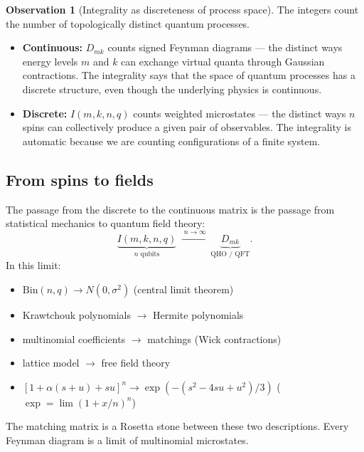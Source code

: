 \documentclass[11pt,a4paper]{article}
\theoremstyle{plain}
\theoremstyle{definition}
\newtheorem{observation}[theorem]{Observation}
\begin{document}
\begin{tcolorbox}[colback=black!5, colframe=black!5, boxrule=0pt,
  sharp corners]
\begin{observation}[Integrality as discreteness of process space]
\label{obs:integers}
The integers count the number of topologically distinct quantum
processes.

\begin{itemize}
\item \textbf{Continuous:} $D_{mk}$ counts signed Feynman diagrams
  --- the distinct ways energy levels $m$ and $k$ can exchange
  virtual quanta through Gaussian contractions. The integrality says
  that the space of quantum processes has a discrete structure,
  even though the underlying physics is continuous.
\item \textbf{Discrete:} $I(m,k,n,q)$ counts weighted microstates
  --- the distinct ways $n$ spins can collectively produce a given
  pair of observables. The integrality is automatic because we are
  counting configurations of a finite system.
\end{itemize}
\end{observation}
\end{tcolorbox}

\subsection{From spins to fields}

\begin{tcolorbox}[breakable, colback=yellow!10, colframe=yellow!10,
  boxrule=0pt, sharp corners]
The passage from the discrete to the continuous matrix is the passage
from statistical mechanics to quantum field theory:
\[
  \underbrace{I(m,k,n,q)}_{\text{$n$ qubits}}
  \;\xrightarrow{\;n \to \infty\;}
  \underbrace{D_{mk}}_{\text{QHO / QFT}}.
\]
In this limit:
\begin{itemize}
\item $\mathrm{Bin}(n,q) \to N(0, \sigma^2)$
  \hfill (central limit theorem)
\item Krawtchouk polynomials $\to$ Hermite polynomials
\item multinomial coefficients $\to$ matchings (Wick contractions)
\item lattice model $\to$ free field theory
\item $[1 + \alpha(s{+}u) + su]^n
  \to \exp(-(s^2 - 4su + u^2)/3)$
  \hfill ($\exp = \lim(1+x/n)^n$)
\end{itemize}

The matching matrix is a Rosetta stone between these two descriptions.
Every Feynman diagram is a limit of multinomial microstates.
\end{tcolorbox}
\end{document}
